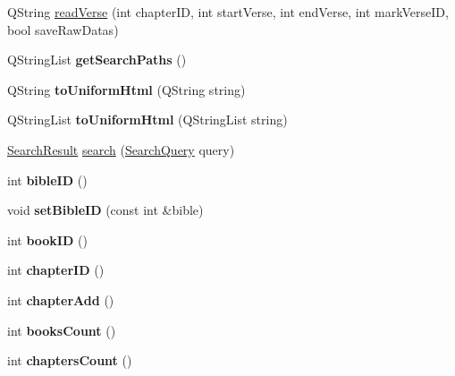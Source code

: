 \begin{DoxyCompactItemize}
\item 
QString \hyperlink{classBible_a515418999329333e8a6a821fc88d006f}{readVerse} (int chapterID, int startVerse, int endVerse, int markVerseID, bool saveRawDatas)
\item 
\hypertarget{classBible_a21a6808e0663d2f99604e137184b2b4d}{
QStringList {\bfseries getSearchPaths} ()}
\label{classBible_a21a6808e0663d2f99604e137184b2b4d}

\item 
\hypertarget{classBible_a2fe743ec79eae111c903a5b0ccfa17c9}{
QString {\bfseries toUniformHtml} (QString string)}
\label{classBible_a2fe743ec79eae111c903a5b0ccfa17c9}

\item 
\hypertarget{classBible_ab279b2e604ad7b2d445235e1302686b7}{
QStringList {\bfseries toUniformHtml} (QStringList string)}
\label{classBible_ab279b2e604ad7b2d445235e1302686b7}

\item 
\hyperlink{classSearchResult}{SearchResult} \hyperlink{classBible_a33103e25381494250b9a351572bb4e8e}{search} (\hyperlink{classSearchQuery}{SearchQuery} query)
\item 
\hypertarget{classBible_a6aeeae4c261ff3a40b28e671bed19c2d}{
int {\bfseries bibleID} ()}
\label{classBible_a6aeeae4c261ff3a40b28e671bed19c2d}

\item 
\hypertarget{classBible_a563553694b582275599e95e81ea0b3de}{
void {\bfseries setBibleID} (const int \&bible)}
\label{classBible_a563553694b582275599e95e81ea0b3de}

\item 
\hypertarget{classBible_a2df47f1e4ba133d041f458d4cf2ce6c1}{
int {\bfseries bookID} ()}
\label{classBible_a2df47f1e4ba133d041f458d4cf2ce6c1}

\item 
\hypertarget{classBible_a161d0777d83b94f31df05d32e77d76bb}{
int {\bfseries chapterID} ()}
\label{classBible_a161d0777d83b94f31df05d32e77d76bb}

\item 
\hypertarget{classBible_a7559212b56e1c9ca36f19a202c90f030}{
int {\bfseries chapterAdd} ()}
\label{classBible_a7559212b56e1c9ca36f19a202c90f030}

\item 
\hypertarget{classBible_a6c88a7a8fda28d1c6dce38d38bc7d24b}{
int {\bfseries booksCount} ()}
\label{classBible_a6c88a7a8fda28d1c6dce38d38bc7d24b}

\item 
\hypertarget{classBible_ae4b274ab0e5983243d44ae95fda1bbb6}{
int {\bfseries chaptersCount} ()}
\label{classBible_ae4b274ab0e5983243d44ae95fda1bbb6}

\end{DoxyCompactItemize}

